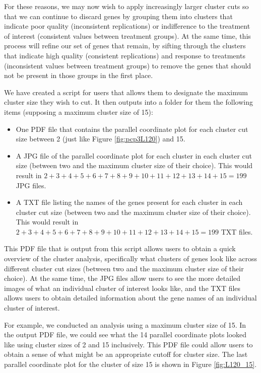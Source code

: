 \documentclass[11pt,a4paper,oldfontcommands,openany]{memoir}
\numberwithin{equation}{section} %
\begin{document}
For these reasons, we may now wish to apply increasingly larger cluster cuts so that we can continue to discard genes by grouping them into clusters that indicate poor quality (inconsistent replications) or indifference to the treatment of interest (consistent values between treatment groups). At the same time, this process will refine our set of genes that remain, by sifting through the clusters that indicate high quality (consistent replications) and response to treatments (inconsistent values between treatment groups) to remove the genes that should not be present in those groups in the first place.

We have created a script for users that allows them to designate the maximum cluster size they wish to cut. It then outputs into a folder for them the following items (supposing a maximum cluster size of 15):

\begin{itemize}

\item One PDF file that contains the parallel coordinate plot for each cluster cut size between 2 (just like Figure \ref{fig:pcp3L120}) and 15.

\item A JPG file of the parallel coordinate plot for each cluster in each cluster cut size (between two and the maximum cluster size of their choice). This would result in $2+3+4+5+6+7+8+9+10+11+12+13+14+15=199$ JPG files.

\item A TXT file listing the names of the genes present for each cluster in each cluster cut size (between two and the maximum cluster size of their choice). This would result in $2+3+4+5+6+7+8+9+10+11+12+13+14+15=199$ TXT files.

\end{itemize}

This PDF file that is output from this script allows users to obtain a quick overview of the cluster analysis, specifically what clusters of genes look like across different cluster cut sizes (between two and the maximum cluster size of their choice). At the same time, the JPG files allow users to see the more detailed images of what an individual cluster of interest looks like, and the TXT files allows users to obtain detailed information about the gene names of an individual cluster of interest.

For example, we conducted an analysis using a maximum cluster size of 15. In the output PDF file, we could see what the 14 parallel coordinate plots looked like using cluster sizes of 2 and 15 inclusively. This PDF file could allow users to obtain a sense of what might be an appropriate cutoff for cluster size. The last parallel coordinate plot for the cluster of size 15 is shown in Figure \ref{fig:L120_15}.
\end{document}
